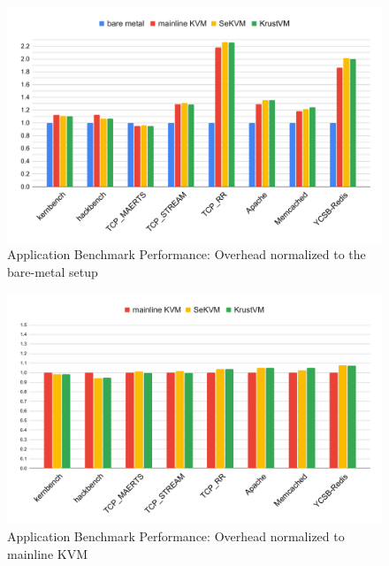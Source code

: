 \begin{figure}[hbtp]
    \includegraphics[scale=0.45]{figures/eval.pdf}
    \caption{Application Benchmark Performance: Overhead normalized to the bare-metal setup}
    \label{fig:eval}
\end{figure}

\begin{figure}[hbtp]
    \includegraphics[scale=0.45]{figures/eval2.pdf}
    \caption{Application Benchmark Performance: Overhead normalized to mainline KVM}
    \label{fig:eval2}
\end{figure}

